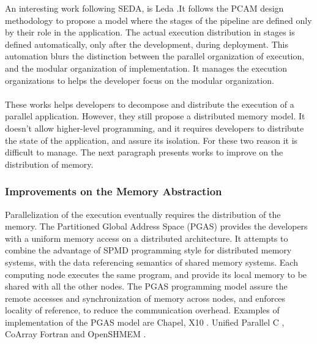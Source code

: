 An interesting work following SEDA, is Leda \cite{Salmito2013,Salmito2014}.It follows the PCAM design methodology \cite{Foster1995} to propose a model where the stages of the pipeline are defined only by their role in the application.
The actual execution distribution in stages is defined automatically, only after the development, during deployment.
This automation blurs the distinction between the parallel organization of execution, and the modular organization of implementation.
It manages the execution organizations to helps the developer focus on the modular organization.

\paragraph{}

These works helps developers to decompose and distribute the execution of a parallel application.
However, they still propose a distributed memory model.
It doesn't allow higher-level programming, and it requires developers to distribute the state of the application, and assure its isolation.
For these two reason it is difficult to manage.
The next paragraph presents works to improve on the distribution of memory.


\subsubsection{Improvements on the Memory Abstraction}

Parallelization of the execution eventually requires the distribution of the memory.
The Partitioned Global Address Space (PGAS) provides the developers with a uniform memory access on a distributed architecture.
It attempts to combine the advantage of SPMD programming style for distributed memory systems, with the data referencing semantics of shared memory systems.
Each computing node executes the same program, and provide its local memory to be shared with all the other nodes.
The PGAS programming model assure the remote accesses and synchronization of memory across nodes, and enforces locality of reference, to reduce the communication overhead.
Examples of implementation of the PGAS model are 
Chapel\cite{Chamberlain2007},
X10 \cite{Charles2005}.
Unified Parallel C \cite{El-Ghazawi2006},
CoArray Fortran \cite{Numrich1998} and
OpenSHMEM \cite{Chapman2010}.

